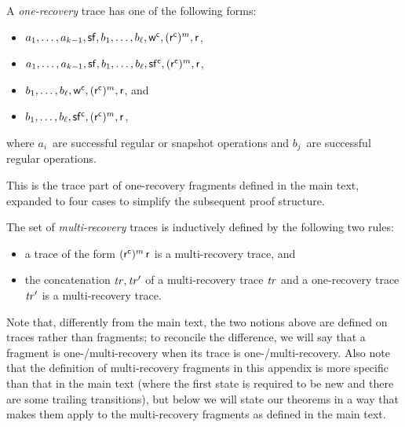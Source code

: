 \begin{definition}
A \emph{one-recovery} trace has one of the following forms:
\begin{itemize}
\item $a_1, \ldots, a_{k-1}, \mathsf{sf}, b_1, \ldots, b_\ell, \mathsf w^\mathsf{c}, (\mathsf{r^c})^m, \mathsf r$\quad,
\item $a_1, \ldots, a_{k-1}, \mathsf{sf}, b_1, \ldots, b_\ell, \mathsf{sf^c}, (\mathsf{r^c})^m, \mathsf r$\quad,
\item $b_1, \ldots, b_\ell, \mathsf w^\mathsf{c}, (\mathsf{r^c})^m, \mathsf r$\quad, and
\item $b_1, \ldots, b_\ell, \mathsf{sf^c}, (\mathsf{r^c})^m, \mathsf r$\quad,
\end{itemize}
where $a_i$~are successful regular or snapshot operations and $b_j$~are successful regular operations.
\end{definition}
This is the trace part of one-recovery fragments defined in the main text, expanded to four cases to simplify the subsequent proof structure.

\begin{definition}
The set of \emph{multi-recovery} traces is inductively defined by the following two rules:
\begin{itemize}
\item a trace of the form $(\mathsf{r^c})^m\,\mathsf r$ is a multi-recovery trace, and
\item the concatenation $\mathit{tr}, \mathit{tr}'$ of a multi-recovery trace $\mathit{tr}$ and a one-recovery trace $\mathit{tr}'$ is a multi-recovery trace.
\end{itemize}
\end{definition}

Note that, differently from the main text, the two notions above are defined on traces rather than fragments; to reconcile the difference, we will say that a fragment is one-/multi-recovery when its trace is one-/multi-recovery.
Also note that the definition of multi-recovery fragments in this appendix is more specific than that in the main text (where the first state is required to be new and there are some trailing transitions), but below we will state our theorems in a way that makes them apply to the multi-recovery fragments as defined in the main text.


